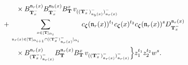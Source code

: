 \documentclass[12pt]{amsart}
\numberwithin{equation}{thm}
\newcommand\bT{\mathbf T}
\newcommand\fn{\mathfrak n}
\renewcommand\a{\alpha}  %
\newcommand\Bz{\boldsymbol\zeta}
\begin{document}
\begin{align}
		\\ \notag & \hspace{5em} \times 
		B_{\bT_x^-}^{\fn_r (x)} B_{\bT_x^-}^{\fn_b(x)} B_{\bT}^x \, v_{((\bT_x^-)_{\fn_b(x)}^-)_{\fn_r(x)}^-} 
	\\ \notag & \hspace{3em} 
	+ \sum_{x \in [\bT]_{\a_i} \atop \fn_r(x) \in [\bT]_{\a_{i+1}} \cap [(\bT_x^-)_{\fn_r(x)}^-]_{\a_i}} 
		c_{\Bz} (\fn_r(x))^{t_1} c_{\Bz} (x)^{t_2} c_{\Bz} (\fn_r (x))^s 
		D_{\bT_x^-}^{\fn_r (x)} 
		\\ \notag & \hspace{5em} \times 
		B_{(\bT_x^-)_{\fn_r(x)}^-}^{\fn_r(x)} B_{\bT}^{\fn_r(x)} B_{\bT}^x \, v_{((\bT_x^-)_{\fn_r(x)}^-)_{\fn_r(x)}^-} 
	\Big\} z_1^{t_1} z_2^{t_2} w^s. 
\end{align}
\end{document}
